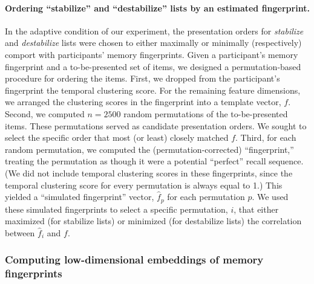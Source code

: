 \documentclass[11pt]{article}
\begin{document}
\paragraph{Ordering ``stabilize'' and ``destabilize'' lists by an estimated
fingerprint.}

In the adaptive condition of our experiment, the presentation orders for
\textit{stabilize} and \textit{destabilize} lists were chosen to either
maximally or minimally (respectively) comport with participants' memory
fingerprints. Given a participant's memory fingerprint and a to-be-presented
set of items, we designed a permutation-based procedure for ordering the items.
First, we dropped from the participant's fingerprint the temporal clustering
score. For the remaining feature dimensions, we arranged the clustering scores
in the fingerprint into a template vector, $f$. Second, we computed $n = 2500$
random permutations of the to-be-presented items. These permutations served as
candidate presentation orders. We sought to select the specific order that most
(or least) closely matched $f$. Third, for each random permutation, we computed
the (permutation-corrected) ``fingerprint,'' treating the permutation as though
it were a potential ``perfect'' recall sequence. (We did not include temporal
clustering scores in these fingerprints, since the temporal clustering score
for every permutation is always equal to 1.) This yielded a ``simulated
fingerprint'' vector, $\hat{f}_p$ for each permutation $p$. We used these
simulated fingerprints to select a specific permutation, $i$, that either
maximized (for stabilize lists) or minimized (for destabilize lists) the
correlation between $\hat{f}_i$ and $f$.

\subsubsection*{Computing low-dimensional embeddings of memory fingerprints}
\end{document}
